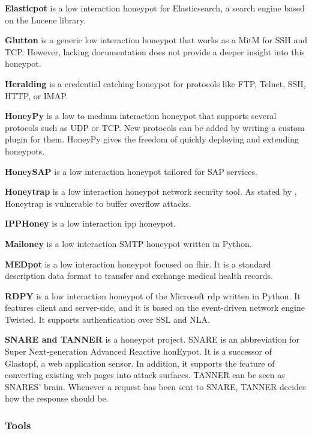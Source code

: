 \textbf{Elasticpot} \cite{elasticpot2021} is a low interaction honeypot for Elasticsearch, a search engine based on the Lucene library.

\textbf{Glutton} \cite{glutton2021} is a generic low interaction honeypot that works as a MitM for SSH and TCP.
However, lacking documentation does not provide a deeper insight into this honeypot.

\textbf{Heralding} \cite{heralding2021} is a credential catching honeypot for protocols like FTP, Telnet, SSH, HTTP, or IMAP.

\textbf{HoneyPy} \cite{honeysap2021} is a low to medium interaction honeypot that supports several protocols such as UDP or TCP.
New protocols can be added by writing a custom plugin for them.
HoneyPy gives the freedom of quickly deploying and extending honeypots.

\textbf{HoneySAP} \cite{honeysap2021} is a low interaction honeypot tailored for SAP services.

\textbf{Honeytrap} \cite{honeytrap2021} is a low interaction honeypot network security tool.
As stated by \citet*{honeytrap2021}, Honeytrap is vulnerable to buffer overflow attacks.

\textbf{IPPHoney} \cite{ipphoney2021} is a low interaction \ac{ipp} honeypot.

\textbf{Mailoney} \cite{mailoney2021} is a low interaction SMTP honeypot written in Python.

\textbf{MEDpot} \cite{medpot2021} is a low interaction honeypot focused on \ac{fhir}.
It is a standard description data format to transfer and exchange medical health records.

\textbf{RDPY} \cite{rdpy2021} is a low interaction honeypot of the Microsoft \ac{rdp} written in Python.
It features client and server-side, and it is based on the event-driven network engine Twisted.
It supports authentication over SSL and NLA.

\textbf{SNARE and TANNER} \cite{snare2021, tanner2021} is a honeypot project.
SNARE is an abbreviation for Super Next-generation Advanced Reactive honEypot.
It is a successor of Glastopf, a web application sensor.
In addition, it supports the feature of converting existing web pages into attack surfaces.
TANNER \cite{tanner2021} can be seen as SNARES' brain.
Whenever a request has been sent to SNARE, TANNER decides how the response should be.

\subsubsection{Tools}

